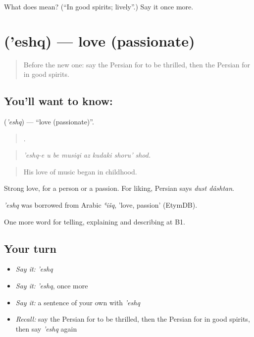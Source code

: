 \begin{tcolorbox}[breakable,colback=teal!4,colframe=teal!35!black,title={Before you move on}]
What does  mean? (\textquotedblleft{}In good spirits; lively\textquotedblright{}.) Say it once more.
\end{tcolorbox}
\section[\texorpdfstring{\fa{عشق} ('eshq)}{عشق ('eshq)}]{ ('eshq) — love (passionate)}

\label{lesson:FA-C486-eshq}



\begin{quote}
Before the new one: say the Persian for to be thrilled, then the Persian for in good spirits.
\end{quote}

\subsection*{You'll want to know: }
\textbf{} (\emph{'eshq}) — \textquotedblleft{}love (passionate)\textquotedblright{}.

\begin{quote}
       .
\end{quote}

\begin{quote}
\emph{'eshq-e u be musiqi az kudaki shoru' shod.}
\end{quote}

\begin{quote}
His love of music began in childhood.
\end{quote}

Strong love, for a person or a passion. For liking, Persian says \emph{dust dâshtan}.

\begin{cousinweb}
\emph{'eshq} was borrowed from Arabic \emph{ʿišq}, 'love, passion' (EtymDB).
\end{cousinweb}

\begin{grammarlens}[title={What you've built}]
One more word for telling, explaining and describing at B1.
\end{grammarlens}

\subsection*{Your turn}
\begin{itemize}
\raggedright
  \item \emph{Say it:} \emph{'eshq}
  \item \emph{Say it:} \emph{'eshq}, once more
  \item \emph{Say it:} a sentence of your own with \emph{'eshq}
  \item \emph{Recall:} say the Persian for to be thrilled, then the Persian for in good spirits, then say \emph{'eshq} again
\end{itemize}

